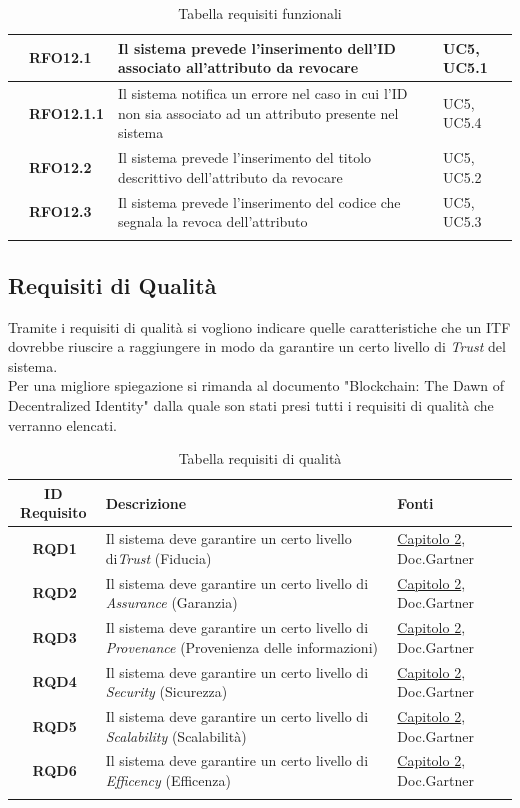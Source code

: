 \begin{longtable}{|r l|p{10cm}|p{2cm}|}
	&\textbf{RFO12.1}&Il sistema prevede l'inserimento dell'ID associato all'attributo da revocare&UC5, UC5.1 \\\hline
	&\textbf{RFO12.1.1}&Il sistema notifica un errore nel caso in cui l'ID non sia associato ad un attributo presente nel sistema&UC5, UC5.4 \\\hline
	&\textbf{RFO12.2}&Il sistema prevede l'inserimento del titolo descrittivo dell'attributo da revocare&UC5, UC5.2 \\\hline
	&\textbf{RFO12.3}&Il sistema prevede l'inserimento del codice che segnala la revoca dell'attributo&UC5, UC5.3 \\\hline
	\caption{Tabella requisiti funzionali}
\end{longtable}
\subsection{Requisiti di Qualità}
Tramite i requisiti di qualità si vogliono indicare quelle caratteristiche che un \gls{ITF} dovrebbe riuscire a raggiungere in modo da garantire un certo livello di \textit{Trust} del sistema.\\
Per una migliore spiegazione si rimanda al documento "Blockchain: The Dawn of Decentralized Identity"\cite{ITF_gartner} dalla quale son stati presi tutti i requisiti di qualità che verranno elencati.
\begin{longtable}{|r l|p{10cm}|p{2.5cm}|}
	\hline
	\multicolumn{2}{|c|}{\textbf{ID Requisito}} & \textbf{Descrizione} & \textbf{Fonti}\tabularnewline
	\hline
	&\textbf{RQD1}&Il sistema deve garantire un certo livello di\textit{Trust} (Fiducia)& \hyperref[cap:tecnologie_e_strumenti]{Capitolo 2}, Doc.Gartner\cite{ITF_gartner}\\\hline
	&\textbf{RQD2}&Il sistema deve garantire un certo livello di \textit{Assurance} (Garanzia)& \hyperref[cap:tecnologie_e_strumenti]{Capitolo 2}, Doc.Gartner\cite{ITF_gartner}\\\hline
	&\textbf{RQD3}&Il sistema deve garantire un certo livello di \textit{Provenance} (Provenienza delle informazioni)& \hyperref[cap:tecnologie_e_strumenti]{Capitolo 2}, Doc.Gartner\cite{ITF_gartner}\\\hline
	&\textbf{RQD4}&Il sistema deve garantire un certo livello di \textit{Security} (Sicurezza)& \hyperref[cap:tecnologie_e_strumenti]{Capitolo 2}, Doc.Gartner\cite{ITF_gartner}\\\hline
	&\textbf{RQD5}&Il sistema deve garantire un certo livello di \textit{Scalability} (Scalabilità)& \hyperref[cap:tecnologie_e_strumenti]{Capitolo 2}, Doc.Gartner\cite{ITF_gartner}\\\hline
	&\textbf{RQD6}&Il sistema deve garantire un certo livello di \textit{Efficency} (Efficenza)& \hyperref[cap:tecnologie_e_strumenti]{Capitolo 2}, Doc.Gartner\cite{ITF_gartner}\\\hline
	\caption{Tabella requisiti di qualità}
\end{longtable}

